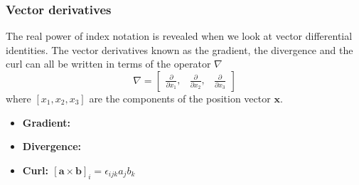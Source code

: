 \documentclass[notes]{beamer}
\begin{document}
\begin{frame}
\frametitle{Vector derivatives}
The real power of index notation is revealed when we look at vector differential identities.
The vector derivatives known as the gradient, the divergence and the curl can all be
written in terms of the operator $\nabla$
\begin{equation*}
\nabla = \begin{bmatrix}
\frac{\partial}{\partial x_1}, &
\frac{\partial}{\partial x_2}, &
\frac{\partial}{\partial x_3}
\end{bmatrix}
\end{equation*}
where $\left[x_1, x_2, x_3 \right]$ are the components of the position vector $\mathbf{x}$.
\begin{itemize}
\item \textbf{Gradient:}
\item \textbf{Divergence:} 
\item \textbf{Curl: $[\mathbf{a \times b}]_i = \epsilon_{ijk} a_j b_k$} 	
\end{itemize}
\end{frame}


\end{document}
